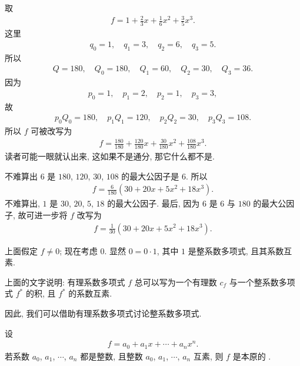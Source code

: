 \begin{example}
    取
    \begin{align*}
        f = 1 + \frac{2}{3} x + \frac{1}{6}x^2 + \frac{3}{5}x^3.
    \end{align*}
    这里
    \begin{align*}
        q_0 = 1, \quad q_1 = 3, \quad q_2 = 6, \quad q_3 = 5.
    \end{align*}
    所以
    \begin{align*}
        Q = 180, \quad Q_0 = 180, \quad Q_1 = 60, \quad Q_2 = 30, \quad Q_3 = 36.
    \end{align*}
    因为
    \begin{align*}
        p_0 = 1, \quad p_1 = 2, \quad p_2 = 1, \quad p_3 = 3,
    \end{align*}
    故
    \begin{align*}
        p_0 Q_0 = 180, \quad p_1 Q_1 = 120, \quad p_2 Q_2 = 30, \quad p_3 Q_3 = 108.
    \end{align*}
    所以 $f$ 可被改写为
    \begin{align*}
        f = \frac{180}{180} + \frac{120}{180} x + \frac{30}{180} x^2 + \frac{108}{180} x^3.
    \end{align*}
    读者可能一眼就认出来, 这如果不是通分, 那它什么都不是.

    不难算出 $6$ 是 $180$, $120$, $30$, $108$ 的最大公因子是 $6$. 所以
    \begin{align*}
        f = \frac{6}{180} (30 + 20x + 5x^2 + 18x^3).
    \end{align*}
    不难算出, $1$ 是 $30$, $20$, $5$, $18$ 的最大公因子. 最后, 因为 $6$ 是 $6$ 与 $180$ 的最大公因子, 故可进一步将 $f$ 改写为
    \begin{align*}
        f = \frac{1}{30} (30 + 20x + 5x^2 + 18x^3).
    \end{align*}
\end{example}

上面假定 $f \neq 0$; 现在考虑 $0$. 显然 $0 = 0 \cdot 1$, 其中 $1$ 是整系数多项式, 且其系数互素.

上面的文字说明: 有理系数多项式 $f$ 总可以写为一个有理数 $c_f$ 与一个整系数多项式 $f^{\ast}$ 的积, 且 $f^{\ast}$ 的系数互素.

因此, 我们可以借助有理系数多项式讨论整系数多项式.

\begin{definition}
    设
    \begin{align*}
        f = a_0 + a_1 x + \cdots + a_n x^n.
    \end{align*}
    若系数 $a_0$, $a_1$, $\cdots$, $a_n$ 都是整数, 且整数 $a_0$, $a_1$, $\cdots$, $a_n$ 互素, 则 $f$ 是本原的 .
\end{definition}

